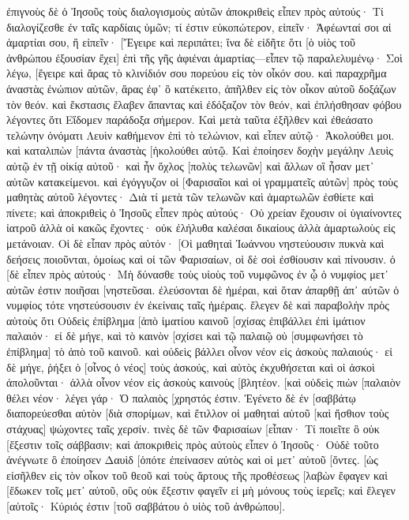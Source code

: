ἐπιγνοὺς δὲ ὁ Ἰησοῦς τοὺς διαλογισμοὺς αὐτῶν ἀποκριθεὶς εἶπεν πρὸς αὐτούς· Τί διαλογίζεσθε ἐν ταῖς καρδίαις ὑμῶν; 
τί ἐστιν εὐκοπώτερον, εἰπεῖν· Ἀφέωνταί σοι αἱ ἁμαρτίαι σου, ἢ εἰπεῖν· [Ἔγειρε καὶ περιπάτει; 
ἵνα δὲ εἰδῆτε ὅτι [ὁ υἱὸς τοῦ ἀνθρώπου ἐξουσίαν ἔχει] ἐπὶ τῆς γῆς ἀφιέναι ἁμαρτίας—εἶπεν τῷ παραλελυμένῳ· Σοὶ λέγω, [ἔγειρε καὶ ἄρας τὸ κλινίδιόν σου πορεύου εἰς τὸν οἶκόν σου. 
καὶ παραχρῆμα ἀναστὰς ἐνώπιον αὐτῶν, ἄρας ἐφ᾽ ὃ κατέκειτο, ἀπῆλθεν εἰς τὸν οἶκον αὐτοῦ δοξάζων τὸν θεόν. 
καὶ ἔκστασις ἔλαβεν ἅπαντας καὶ ἐδόξαζον τὸν θεόν, καὶ ἐπλήσθησαν φόβου λέγοντες ὅτι Εἴδομεν παράδοξα σήμερον. 
Καὶ μετὰ ταῦτα ἐξῆλθεν καὶ ἐθεάσατο τελώνην ὀνόματι Λευὶν καθήμενον ἐπὶ τὸ τελώνιον, καὶ εἶπεν αὐτῷ· Ἀκολούθει μοι. 
καὶ καταλιπὼν [πάντα ἀναστὰς [ἠκολούθει αὐτῷ. 
Καὶ ἐποίησεν δοχὴν μεγάλην Λευὶς αὐτῷ ἐν τῇ οἰκίᾳ αὐτοῦ· καὶ ἦν ὄχλος [πολὺς τελωνῶν] καὶ ἄλλων οἳ ἦσαν μετ᾽ αὐτῶν κατακείμενοι. 
καὶ ἐγόγγυζον οἱ [Φαρισαῖοι καὶ οἱ γραμματεῖς αὐτῶν] πρὸς τοὺς μαθητὰς αὐτοῦ λέγοντες· Διὰ τί μετὰ τῶν τελωνῶν καὶ ἁμαρτωλῶν ἐσθίετε καὶ πίνετε; 
καὶ ἀποκριθεὶς ὁ Ἰησοῦς εἶπεν πρὸς αὐτούς· Οὐ χρείαν ἔχουσιν οἱ ὑγιαίνοντες ἰατροῦ ἀλλὰ οἱ κακῶς ἔχοντες· 
οὐκ ἐλήλυθα καλέσαι δικαίους ἀλλὰ ἁμαρτωλοὺς εἰς μετάνοιαν. 
Οἱ δὲ εἶπαν πρὸς αὐτόν· [Οἱ μαθηταὶ Ἰωάννου νηστεύουσιν πυκνὰ καὶ δεήσεις ποιοῦνται, ὁμοίως καὶ οἱ τῶν Φαρισαίων, οἱ δὲ σοὶ ἐσθίουσιν καὶ πίνουσιν. 
ὁ [δὲ εἶπεν πρὸς αὐτούς· Μὴ δύνασθε τοὺς υἱοὺς τοῦ νυμφῶνος ἐν ᾧ ὁ νυμφίος μετ᾽ αὐτῶν ἐστιν ποιῆσαι [νηστεῦσαι. 
ἐλεύσονται δὲ ἡμέραι, καὶ ὅταν ἀπαρθῇ ἀπ᾽ αὐτῶν ὁ νυμφίος τότε νηστεύσουσιν ἐν ἐκείναις ταῖς ἡμέραις. 
ἔλεγεν δὲ καὶ παραβολὴν πρὸς αὐτοὺς ὅτι Οὐδεὶς ἐπίβλημα [ἀπὸ ἱματίου καινοῦ [σχίσας ἐπιβάλλει ἐπὶ ἱμάτιον παλαιόν· εἰ δὲ μήγε, καὶ τὸ καινὸν [σχίσει καὶ τῷ παλαιῷ οὐ [συμφωνήσει τὸ ἐπίβλημα] τὸ ἀπὸ τοῦ καινοῦ. 
καὶ οὐδεὶς βάλλει οἶνον νέον εἰς ἀσκοὺς παλαιούς· εἰ δὲ μήγε, ῥήξει ὁ [οἶνος ὁ νέος] τοὺς ἀσκούς, καὶ αὐτὸς ἐκχυθήσεται καὶ οἱ ἀσκοὶ ἀπολοῦνται· 
ἀλλὰ οἶνον νέον εἰς ἀσκοὺς καινοὺς [βλητέον. 
[καὶ οὐδεὶς πιὼν [παλαιὸν θέλει νέον· λέγει γάρ· Ὁ παλαιὸς [χρηστός ἐστιν. 
Ἐγένετο δὲ ἐν [σαββάτῳ διαπορεύεσθαι αὐτὸν [διὰ σπορίμων, καὶ ἔτιλλον οἱ μαθηταὶ αὐτοῦ [καὶ ἤσθιον τοὺς στάχυας] ψώχοντες ταῖς χερσίν. 
τινὲς δὲ τῶν Φαρισαίων [εἶπαν· Τί ποιεῖτε ὃ οὐκ [ἔξεστιν τοῖς σάββασιν; 
καὶ ἀποκριθεὶς πρὸς αὐτοὺς εἶπεν ὁ Ἰησοῦς· Οὐδὲ τοῦτο ἀνέγνωτε ὃ ἐποίησεν Δαυὶδ [ὁπότε ἐπείνασεν αὐτὸς καὶ οἱ μετ᾽ αὐτοῦ [ὄντες. 
[ὡς εἰσῆλθεν εἰς τὸν οἶκον τοῦ θεοῦ καὶ τοὺς ἄρτους τῆς προθέσεως [λαβὼν ἔφαγεν καὶ [ἔδωκεν τοῖς μετ᾽ αὐτοῦ, οὓς οὐκ ἔξεστιν φαγεῖν εἰ μὴ μόνους τοὺς ἱερεῖς; 
καὶ ἔλεγεν [αὐτοῖς· Κύριός ἐστιν [τοῦ σαββάτου ὁ υἱὸς τοῦ ἀνθρώπου]. 

